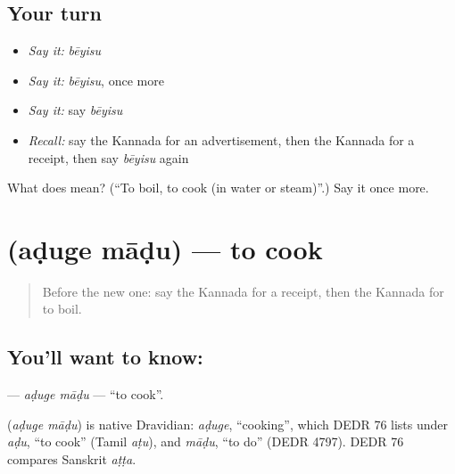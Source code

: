 \subsection*{Your turn}
\begin{itemize}
\raggedright
  \item \emph{Say it:} \emph{bēyisu}
  \item \emph{Say it:} \emph{bēyisu}, once more
  \item \emph{Say it:} say \emph{bēyisu}
  \item \emph{Recall:} say the Kannada for an advertisement, then the Kannada for a receipt, then say \emph{bēyisu} again
\end{itemize}

\begin{tcolorbox}[breakable,colback=teal!4,colframe=teal!35!black,title={Before you move on}]
What does  mean? (\textquotedblleft{}To boil, to cook (in water or steam)\textquotedblright{}.) Say it once more.
\end{tcolorbox}
\section[\texorpdfstring{\kn{ಅಡುಗೆ} \kn{ಮಾಡು} (aḍuge māḍu)}{ಅಡುಗೆ ಮಾಡು (aḍuge māḍu)}]{  (aḍuge māḍu) — to cook}

\label{lesson:KA-C158-aduge-madu}



\begin{quote}
Before the new one: say the Kannada for a receipt, then the Kannada for to boil.
\end{quote}

\subsection*{You'll want to know:  }
\textbf{ } — \emph{aḍuge māḍu} — \textquotedblleft{}to cook\textquotedblright{}.

\begin{cousinweb}
\textbf{ } (\emph{aḍuge māḍu}) is native Dravidian: \emph{aḍuge}, \textquotedblleft{}cooking\textquotedblright{}, which DEDR 76 lists under \emph{aḍu}, \textquotedblleft{}to cook\textquotedblright{} (Tamil \emph{aṭu}), and \emph{māḍu}, \textquotedblleft{}to do\textquotedblright{} (DEDR 4797). DEDR 76 compares Sanskrit \emph{aṭṭa}.
\end{cousinweb}

